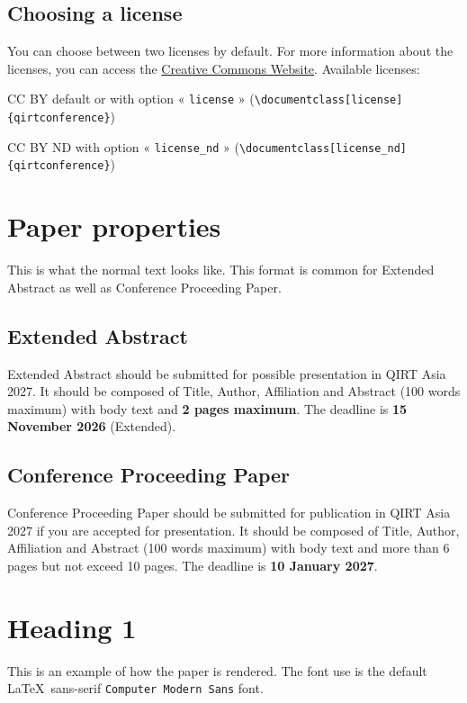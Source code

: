 \documentclass[license]{qirtconference}
\begin{document}
\subsection{Choosing a license}
You can choose between two licenses by default. For more information about the licenses, you can access the \href{https://creativecommons.org}{Creative Commons Website}. Available licenses:
\begin{itemize*}
\item CC BY default or with option « \verb~license~ » (\verb~\documentclass[license]{qirtconference}~)
\item CC BY ND with option « \verb~license_nd~ » (\verb~\documentclass[license_nd]{qirtconference}~)
\end{itemize*}

\section{Paper properties}

This is what the normal text looks like. This format is common for Extended Abstract as well as Conference Proceeding Paper.

\subsection{Extended Abstract}
Extended Abstract should be submitted for possible presentation in QIRT Asia 2027. It should be composed of Title, Author, Affiliation and Abstract (100 words maximum) with body text and \textbf{2 pages maximum}. The deadline is \textbf{15 November 2026} (Extended).

\subsection{Conference Proceeding Paper}
Conference Proceeding Paper should be submitted for publication in QIRT Asia 2027 if you are accepted for presentation. It should be composed of Title, Author, Affiliation and Abstract (100 words maximum) with body text and more than 6 pages but not exceed 10 pages. The deadline is \textbf{10 January 2027}.

\section{Heading 1}

This is an example of how the paper is rendered. The font use is the default \LaTeX\ sans-serif \verb~Computer Modern Sans~ font.
\end{document}
